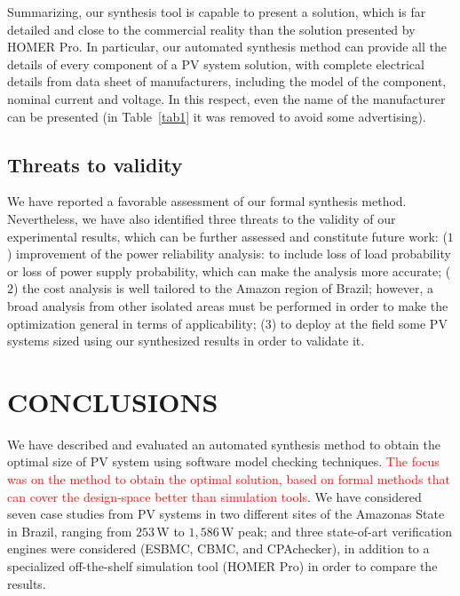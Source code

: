 \documentclass[review]{elsarticle}
\begin{document}
Summarizing, our synthesis tool is capable to present a 
solution, which is far detailed and close to the commercial 
reality than the solution presented by HOMER Pro. 
In particular, our automated synthesis method 
can provide all the details of every component of 
a PV system solution, with complete electrical details 
from data sheet of manufacturers, including 
the model of the component, nominal current and voltage. 
In this respect, even the name of the manufacturer 
can be presented (in Table~\ref{tab1} it was removed 
to avoid some advertising).

\subsection{Threats to validity}

We have reported a favorable assessment of our formal synthesis method. 
Nevertheless, we have also identified three threats to the validity 
of our experimental results, which can be further assessed and 
constitute future work: ($1$) improvement of the power reliability 
analysis: to include loss of load probability or loss of power 
supply probability, which can make the analysis more accurate; 
($2$) the cost analysis is well tailored to the Amazon region of Brazil; 
however, a broad analysis from other isolated areas must be 
performed in order to make the optimization general in terms 
of applicability; ($3$) to deploy at the field some PV systems 
sized using our synthesized results in order to validate it.

\section{CONCLUSIONS}
\label{sec:Conclusion}

We have described and evaluated an automated synthesis method 
to obtain the optimal size of PV system using software model 
checking techniques. \textcolor{red}{The focus was on the method to obtain the optimal solution, based on formal methods that can cover the design-space better than simulation tools}. We have considered seven case studies 
from PV systems in two different sites of the Amazonas State 
in Brazil, ranging from $253$\,W to $1,586$\,W peak; and 
three state-of-art verification engines were considered 
(ESBMC, CBMC, and CPAchecker), in addition to a specialized 
off-the-shelf simulation tool (HOMER Pro) in order to compare the results.
\end{document}
